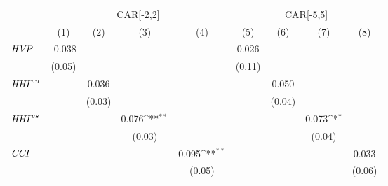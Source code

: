 {
\def\sym#1{\ifmmode^{#1}\else\(^{#1}\)\fi}
\begin{tabular}{l*{8}{c}}
\toprule
                    &\multicolumn{4}{c}{CAR[-2,2]}                                                          &\multicolumn{4}{c}{CAR[-5,5]}                                                          \\\cmidrule(lr){2-5}\cmidrule(lr){6-9}
                    &\multicolumn{1}{c}{(1)}         &\multicolumn{1}{c}{(2)}         &\multicolumn{1}{c}{(3)}         &\multicolumn{1}{c}{(4)}         &\multicolumn{1}{c}{(5)}         &\multicolumn{1}{c}{(6)}         &\multicolumn{1}{c}{(7)}         &\multicolumn{1}{c}{(8)}         \\
\midrule
${\it HVP}$         &      -0.038         &                     &                     &                     &       0.026         &                     &                     &                     \\
                    &      (0.05)         &                     &                     &                     &      (0.11)         &                     &                     &                     \\
${\it HHI}^{vn}$    &                     &       0.036         &                     &                     &                     &       0.050         &                     &                     \\
                    &                     &      (0.03)         &                     &                     &                     &      (0.04)         &                     &                     \\
${\it HHI}^{vs}$    &                     &                     &       0.076\sym{**} &                     &                     &                     &       0.073\sym{*}  &                     \\
                    &                     &                     &      (0.03)         &                     &                     &                     &      (0.04)         &                     \\
${\it CCI}$         &                     &                     &                     &       0.095\sym{**} &                     &                     &                     &       0.033         \\
                    &                     &                     &                     &      (0.05)         &                     &                     &                     &      (0.06)         \\

\end{tabular}}
